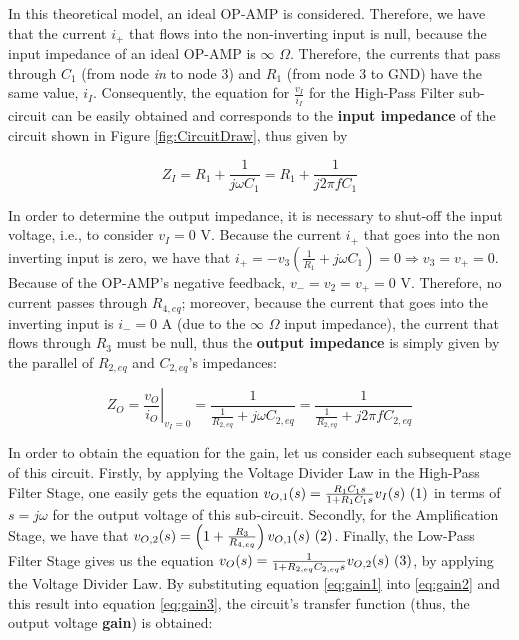\par

In this theoretical model, an ideal OP-AMP is considered. Therefore, we have that the current $i_+$ that flows into the non-inverting input is null, because the input impedance of an ideal OP-AMP is $\infty$ $\Omega$. Therefore, the currents that pass through $C_1$ (from node \textit{in} to node 3) and $R_1$ (from node 3 to GND) have the same value, $i_I$. Consequently, the equation for $\frac{v_I}{i_I}$ for the High-Pass Filter sub-circuit can be easily obtained and corresponds to the \textbf{input impedance} of the circuit shown in Figure \ref{fig:CircuitDraw}, thus given by

\begin{equation} \label{eq:input_impedance}
  Z_I=R_1+\frac{1}{j\omega C_1}=R_1+\frac{1}{j2\pi fC_1}
\end{equation}

In order to determine the output impedance, it is necessary to shut-off the input voltage, i.e., to consider $v_I=0$ V. Because the current $i_+$ that goes into the non inverting input is zero, we have that $i_+=-v_3\left(\frac{1}{R_1}+j\omega C_1\right)=0\Rightarrow v_3=v_+=0$. Because of the OP-AMP's negative feedback, $v_-=v_2=v_+=0$ V. Therefore, no current passes through $R_{4,eq}$; moreover, because the current that goes into the inverting input is $i_-=0$ A (due to the $\infty$ $\Omega$ input impedance), the current that flows through $R_3$ must be null, thus the \textbf{output impedance} is simply given by the parallel of $R_{2,eq}$ and $C_{2,eq}$'s impedances:

\begin{equation} \label{eq:output_impedance}
  Z_O=\left.\frac{v_O}{i_O}\right|_{v_I=0}=\frac{1}{\frac{1}{R_{2,eq}}+j\omega C_{2,eq}}=\frac{1}{\frac{1}{R_{2,eq}}+j2\pi fC_{2,eq}}
\end{equation}

In order to obtain the equation for the gain, let us consider each subsequent stage of this circuit. Firstly, by applying the Voltage Divider Law in the High-Pass Filter Stage, one easily gets the equation $v_{O,1}(s)=\frac{R_1C_1s}{1+R_1C_1s}v_I(s)~\refstepcounter{equation}(\theequation) \label{eq:gain1}$ in terms of $s=j\omega$ for the output voltage of this sub-circuit. Secondly, for the Amplification Stage, we have that $v_{O,2}(s)=\left(1+\frac{R_3}{R_{4,eq}}\right)v_{O,1}(s)~\refstepcounter{equation}(\theequation) \label{eq:gain2}$. Finally, the Low-Pass Filter Stage gives us the equation $v_O(s)=\frac{1}{1+R_{2,eq}C_{2,eq}s}v_{O,2}(s)~\refstepcounter{equation}(\theequation) \label{eq:gain3}$, by applying the Voltage Divider Law. By substituting equation \ref{eq:gain1} into \ref{eq:gain2} and this result into equation \ref{eq:gain3}, the circuit's transfer function (thus, the output voltage \textbf{gain}) is obtained:


